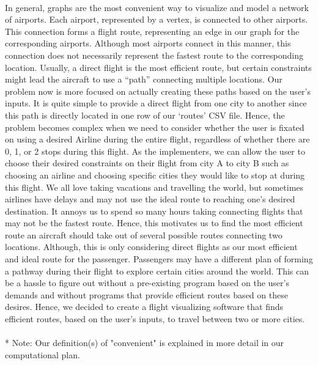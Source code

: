 \documentclass[fontsize=11pt]{article}
\begin{document}
\\
In general, graphs are the most convenient way to visualize and model a network of airports. Each airport, represented by a vertex, is connected to other airports. This connection forms a flight route, representing an edge in our graph for the corresponding airports. Although most airports connect in this manner, this connection does not necessarily represent the fastest route to the corresponding location. Usually, a direct flight is the most efficient route, but certain constraints might lead the aircraft to use a “path” connecting multiple locations. Our problem now is more focused on actually creating these paths based on the user’s inputs. It is quite simple to provide a direct flight from one city to another since this path is directly located in one row of our ‘routes’ CSV file. Hence, the problem becomes complex when we need to consider whether the user is fixated on using a desired Airline during the entire flight, regardless of whether there are 0, 1, or 2 stops during this flight. As the implementers, we can allow the user to choose their desired constraints on their flight from city A to city B such as choosing an airline and choosing specific cities they would like to stop at during this flight. We all love taking vacations and travelling the world, but sometimes airlines have delays and may not use the ideal route to reaching one’s desired destination. It annoys us to spend so many hours taking connecting flights that may not be the fastest route. Hence, this motivates us to find the most efficient route an aircraft should take out of several possible routes connecting two locations. Although, this is only considering direct flights as our most efficient and ideal route for the passenger. Passengers may have a different plan of forming a pathway during their flight to explore certain cities around the world. This can be a hassle to figure out without a pre-existing program based on the user’s demands and without programs that provide efficient routes based on these desires. Hence, we decided to create a flight visualizing software that finds efficient routes, based on the user’s inputs, to travel between two or more cities.\\
\\
* Note: Our definition(s) of "convenient" is explained in more detail in our computational plan.

\newpage
\end{document}
